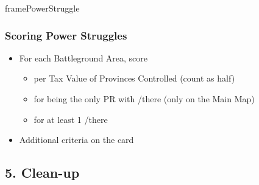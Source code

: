 \documentclass[10pt]{article}
\begin{document}
\begin{dynamiccontents*}{framePowerStruggle}
	\subsubsection*{Scoring Power Struggles }
	\begin{itemize}
		\item For each Battleground Area, score
		\begin{itemize}
			\item {} per Tax Value of Provinces Controlled (\vassals count as half)
			\item {} for being the only PR with \towns/\vassals there (only on the Main Map)
			\item {} for at least 1 \alliance/\marriage there
		\end{itemize}
		\item Additional criteria on the card
	\end{itemize}
\end{dynamiccontents*}

\subsection*{5. Clean-up}
\end{document}
